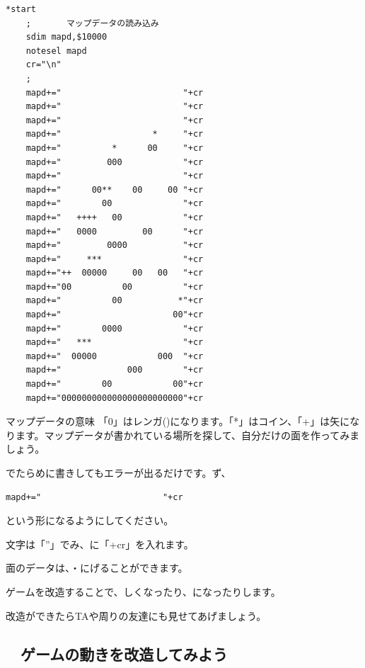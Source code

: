\documentclass[text04.tex]{subfiles}
\begin{document}
\begin{lstlisting}[firstnumber=58,caption=jamp.hspのプログラムの一部]
*start
	;       マップデータの読み込み
	sdim mapd,$10000
	notesel mapd
	cr="\n"
	;
	mapd+="                        "+cr
	mapd+="                        "+cr
	mapd+="                        "+cr
	mapd+="                  *     "+cr
	mapd+="          *      00     "+cr
	mapd+="         000            "+cr
	mapd+="                        "+cr
	mapd+="      00**    00     00 "+cr
	mapd+="        00              "+cr
	mapd+="   ++++   00            "+cr
	mapd+="   0000         00      "+cr
	mapd+="         0000           "+cr
	mapd+="     ***                "+cr
	mapd+="++  00000     00   00   "+cr
	mapd+="00          00          "+cr
	mapd+="          00           *"+cr
	mapd+="                      00"+cr
	mapd+="        0000            "+cr
	mapd+="   ***                  "+cr
	mapd+="  00000            000  "+cr
	mapd+="             000        "+cr
	mapd+="        00            00"+cr
	mapd+="000000000000000000000000"+cr
\end{lstlisting}



\begin{itembox}[c]{マップデータの意味}
    「0」はレンガ()になります。「*」はコイン、「+」は矢になります。マップデータが書かれている場所を探して、自分だけの面を作ってみましょう。
\end{itembox}

でたらめに書きしてもエラーが出るだけです。ず、

\begin{lstlisting}[numbers=none]
	mapd+="                        "+cr
\end{lstlisting}

という形になるようにしてください。

文字は「”」でみ、に「+cr」を入れます。

面のデータは、・にげることができます。


\exampleanswer

ゲームを改造することで、しくなったり、になったりします。

改造ができたらTAや周りの友達にも見せてあげましょう。

\newpage
\subsection{\useOmetoiExample　ゲームの動きを改造してみよう}
\end{document}
